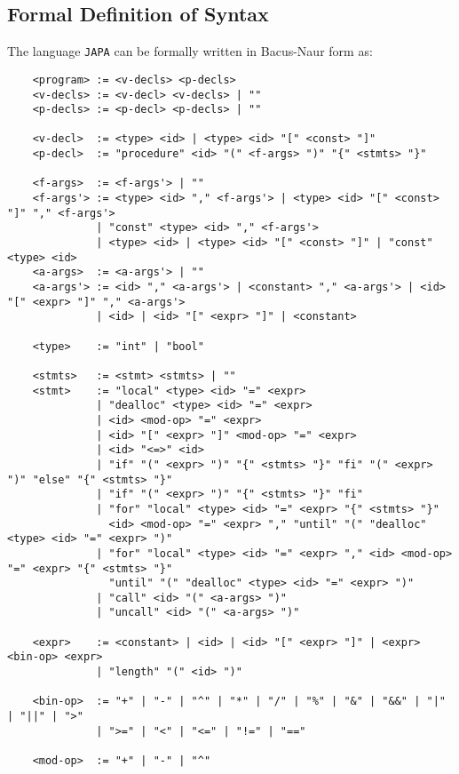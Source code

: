 \subsection{Formal Definition of Syntax}
The language \texttt{JAPA} can be formally written in Bacus-Naur form as:

\begin{verbatim}
    <program> := <v-decls> <p-decls>
    <v-decls> := <v-decl> <v-decls> | ""
    <p-decls> := <p-decl> <p-decls> | ""

    <v-decl>  := <type> <id> | <type> <id> "[" <const> "]"
    <p-decl>  := "procedure" <id> "(" <f-args> ")" "{" <stmts> "}"

    <f-args>  := <f-args'> | ""
    <f-args'> := <type> <id> "," <f-args'> | <type> <id> "[" <const> "]" "," <f-args'>
              | "const" <type> <id> "," <f-args'>
              | <type> <id> | <type> <id> "[" <const> "]" | "const" <type> <id>
    <a-args>  := <a-args'> | ""
    <a-args'> := <id> "," <a-args'> | <constant> "," <a-args'> | <id> "[" <expr> "]" "," <a-args'>
              | <id> | <id> "[" <expr> "]" | <constant> 
    
    <type>    := "int" | "bool"

    <stmts>   := <stmt> <stmts> | ""
    <stmt>    := "local" <type> <id> "=" <expr>
              | "dealloc" <type> <id> "=" <expr>
              | <id> <mod-op> "=" <expr>
              | <id> "[" <expr> "]" <mod-op> "=" <expr>
              | <id> "<=>" <id>
              | "if" "(" <expr> ")" "{" <stmts> "}" "fi" "(" <expr> ")" "else" "{" <stmts> "}"
              | "if" "(" <expr> ")" "{" <stmts> "}" "fi"
              | "for" "local" <type> <id> "=" <expr> "{" <stmts> "}"
                <id> <mod-op> "=" <expr> "," "until" "(" "dealloc" <type> <id> "=" <expr> ")"
              | "for" "local" <type> <id> "=" <expr> "," <id> <mod-op> "=" <expr> "{" <stmts> "}"
                "until" "(" "dealloc" <type> <id> "=" <expr> ")"
              | "call" <id> "(" <a-args> ")"
              | "uncall" <id> "(" <a-args> ")"

    <expr>    := <constant> | <id> | <id> "[" <expr> "]" | <expr> <bin-op> <expr>
              | "length" "(" <id> ")"

    <bin-op>  := "+" | "-" | "^" | "*" | "/" | "%" | "&" | "&&" | "|" | "||" | ">"
              | ">=" | "<" | "<=" | "!=" | "=="
    
    <mod-op>  := "+" | "-" | "^"
\end{verbatim}



